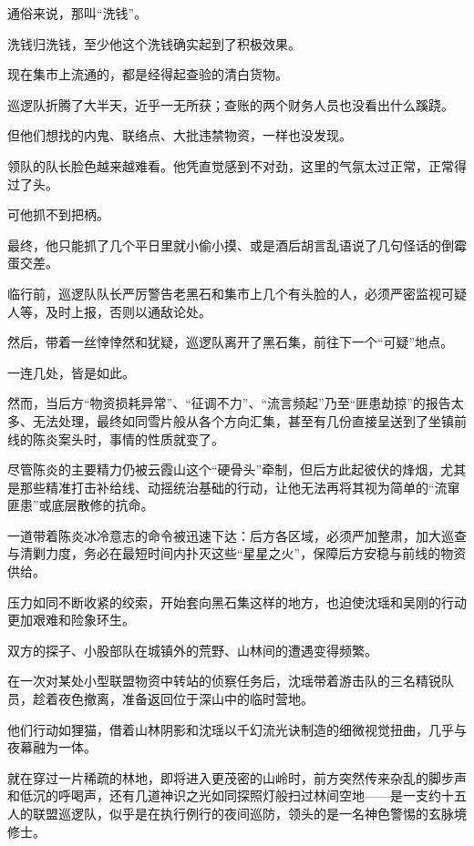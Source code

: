 通俗来说，那叫“洗钱”。

洗钱归洗钱，至少他这个洗钱确实起到了积极效果。

现在集市上流通的，都是经得起查验的清白货物。

巡逻队折腾了大半天，近乎一无所获；查账的两个财务人员也没看出什么蹊跷。

但他们想找的内鬼、联络点、大批违禁物资，一样也没发现。

领队的队长脸色越来越难看。他凭直觉感到不对劲，这里的气氛太过正常，正常得过了头。

可他抓不到把柄。

最终，他只能抓了几个平日里就小偷小摸、或是酒后胡言乱语说了几句怪话的倒霉蛋交差。

临行前，巡逻队队长严厉警告老黑石和集市上几个有头脸的人，必须严密监视可疑人等，及时上报，否则以通敌论处。

然后，带着一丝悻悻然和犹疑，巡逻队离开了黑石集，前往下一个“可疑”地点。

\vspace{2em}

一连几处，皆是如此。

\vspace{2em}

然而，当后方“物资损耗异常”、“征调不力”、“流言频起”乃至“匪患劫掠”的报告太多、无法处理，最终如同雪片般从各个方向汇集，甚至有几份直接呈送到了坐镇前线的陈炎案头时，事情的性质就变了。

尽管陈炎的主要精力仍被云霞山这个“硬骨头”牵制，但后方此起彼伏的烽烟，尤其是那些精准打击补给线、动摇统治基础的行动，让他无法再将其视为简单的“流窜匪患”或底层散修的抗命。

一道带着陈炎冰冷意志的命令被迅速下达：后方各区域，必须严加整肃，加大巡查与清剿力度，务必在最短时间内扑灭这些“星星之火”，保障后方安稳与前线的物资供给。

压力如同不断收紧的绞索，开始套向黑石集这样的地方，也迫使沈瑶和吴刚的行动更加艰难和险象环生。

双方的探子、小股部队在城镇外的荒野、山林间的遭遇变得频繁。

在一次对某处小型联盟物资中转站的侦察任务后，沈瑶带着游击队的三名精锐队员，趁着夜色撤离，准备返回位于深山中的临时营地。

他们行动如狸猫，借着山林阴影和沈瑶以千幻流光诀制造的细微视觉扭曲，几乎与夜幕融为一体。

就在穿过一片稀疏的林地，即将进入更茂密的山岭时，前方突然传来杂乱的脚步声和低沉的呼喝声，还有几道神识之光如同探照灯般扫过林间空地——是一支约十五人的联盟巡逻队，似乎是在执行例行的夜间巡防，领头的是一名神色警惕的玄脉境修士。

